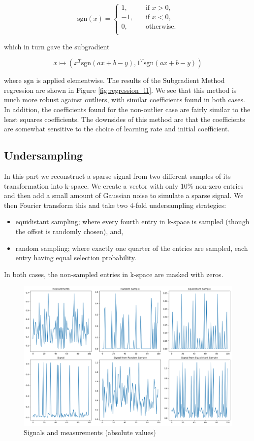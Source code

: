 \documentclass[12pt]{article}
\begin{document}
\[
\text{sgn}(x) =
\begin{cases}
    1,   &\quad\text{if }x>0,\\
    -1,  &\quad\text{if }x<0,\\
    0,   &\quad\text{otherwise.}\\
\end{cases}
\]

which in turn gave the subgradient

\[x\mapsto(x^T\text{sgn}(ax+b-y), 1^T\text{sgn}(ax+b-y))\]

where $\text{sgn}$ is applied elementwise.
The results of the Subgradient Method regression are shown in Figure \ref{fig:regression_l1}.
We see that this method is much more robust against outliers, with similar coefficients found in both cases.
In addition, the coefficients found for the non-outlier case are fairly similar to the least squares coefficients.
The downsides of this method are that the coefficients are somewhat sensitive to the choice of learning rate and initial coefficient.

\subsection{Undersampling} \label{section:undersampling}

In this part we reconstruct a sparse signal from two different samples of its transformation into k-space.
We create a vector with only 10\% non-zero entries and then add a small amount of Gaussian noise to simulate a sparse signal.
We then Fourier transform this and take two 4-fold undersampling strategies:
\begin{itemize}
    \item equidistant sampling; where every fourth entry in k-space is sampled (though the offset is randomly chosen), and,
    \item random sampling; where exactly one quarter of the entries are sampled, each entry having equal selection probability.
\end{itemize}
In both cases, the non-sampled entries in k-space are masked with zeros.

\begin{figure}[htp]
    \includegraphics[scale=0.36, center]{figures/signal.png}
    \caption{Signals and measurements (absolute values)}
    \label{fig:signal}
\end{figure}
\end{document}

